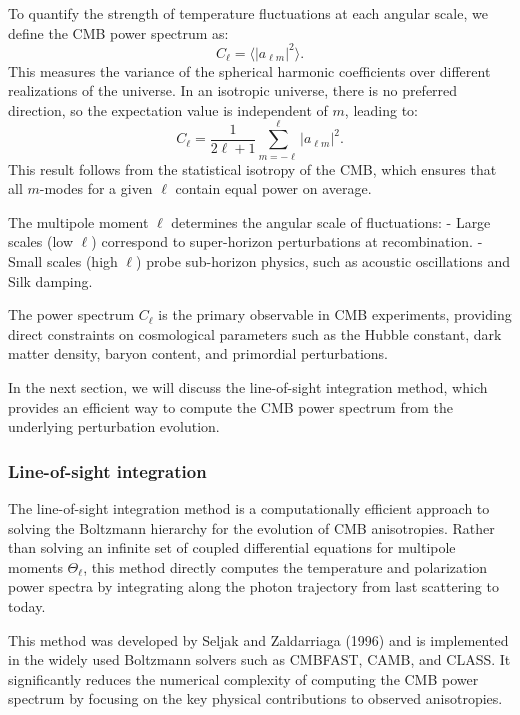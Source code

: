 \documentclass{aa}
\begin{document}
To quantify the strength of temperature fluctuations at each angular scale, we define the CMB power spectrum as:
\begin{equation}
C_\ell = \langle |a_{\ell m}|^2 \rangle.
\end{equation}
This measures the variance of the spherical harmonic coefficients over different realizations of the universe. In an isotropic universe, there is no preferred direction, so the expectation value is independent of $m$, leading to:
\begin{equation}
C_\ell = \frac{1}{2\ell+1} \sum_{m=-\ell}^{\ell} |a_{\ell m}|^2.
\end{equation}
This result follows from the statistical isotropy of the CMB, which ensures that all $m$-modes for a given $\ell$ contain equal power on average.  

The multipole moment $\ell$ determines the angular scale of fluctuations:
- Large scales (low $\ell$) correspond to super-horizon perturbations at recombination.
- Small scales (high $\ell$) probe sub-horizon physics, such as acoustic oscillations and Silk damping.

The power spectrum $C_\ell$ is the primary observable in CMB experiments, providing direct constraints on cosmological parameters such as the Hubble constant, dark matter density, baryon content, and primordial perturbations.

In the next section, we will discuss the line-of-sight integration method, which provides an efficient way to compute the CMB power spectrum from the underlying perturbation evolution.
\color{black}





\subsubsection{Line-of-sight integration}
\color{Plum}
The line-of-sight integration method is a computationally efficient approach to solving the Boltzmann hierarchy for the evolution of CMB anisotropies. Rather than solving an infinite set of coupled differential equations for multipole moments $\Theta_\ell$, this method directly computes the temperature and polarization power spectra by integrating along the photon trajectory from last scattering to today.  

This method was developed by Seljak and Zaldarriaga (1996) and is implemented in the widely used Boltzmann solvers such as CMBFAST, CAMB, and CLASS. It significantly reduces the numerical complexity of computing the CMB power spectrum by focusing on the key physical contributions to observed anisotropies.
\end{document}

